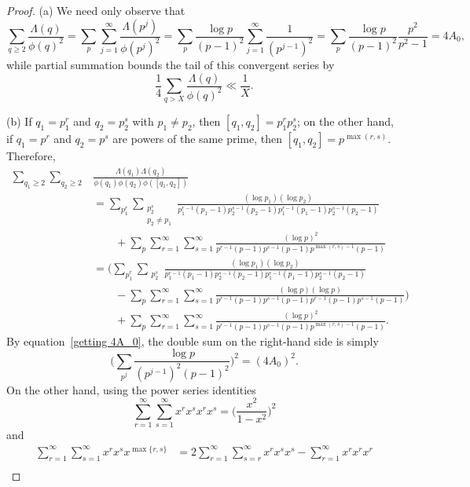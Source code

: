 \documentclass[12pt,reqno]{amsart}
\theoremstyle{definition}
\begin{document}
\begin{proof}
(a) We need only observe that
\begin{equation}  \label{getting 4A_0}
\sum_{q \geq 2} \frac{\Lambda(q)}{\phi(q)^2} = \sum_{p} \sum_{j = 1}^\infty \frac{\Lambda(p^j)}{\phi(p^j)^2} = \sum_{p} \frac{\log p}{(p-1)^2} \sum_{j = 1}^\infty \frac{1}{(p^{j-1})^2} = \sum_{p} \frac{\log p}{(p-1)^2} \frac{p^2}{p^2-1} = 4A_0,
\end{equation}
while partial summation bounds the tail of this convergent series by
\[
\frac{1}{4} \sum_{q > X} \frac{\Lambda(q)}{\phi(q)^2} \ll \frac{1}{X}.
\]

(b) If $q_1 = p_1^r$ and $q_2 = p_2^s$ with $p_1 \neq p_2$, then $[q_1, q_2] = p_1^r p_2^s$; on the other hand, if $q_1 = p^r$ and $q_2 = p^s$ are powers of the same prime, then $[q_1, q_2] = p^{\max(r, s)}$. Therefore,
\begin{align}\label{varianceconstantlastpart}
\sum_{q_1\ge2}\sum_{q_2\ge2} & \frac{\Lambda(q_1)\Lambda(q_2)}{\phi(q_1)\phi(q_2)\phi([q_1, q_2])}\nonumber \\
&= \sum_{p_1^r} \sum_{\substack{p_2^s \\ p_2\ne p_1}} \frac{(\log p_1)(\log p_2)}{p_1^{r-1}(p_1-1)p_2^{s-1}(p_2-1)p_1^{r-1}(p_1-1)p_2^{s-1}(p_2-1)}  \nonumber \\
&\qquad{}+ \sum_p \sum_{r=1}^\infty \sum_{s=1}^\infty \frac{(\log p)^2}{p^{r-1}(p-1)p^{s-1}(p-1)p^{\max(r, s)-1}(p-1)} \nonumber \\
&= \bigg( \sum_{p_1^r} \sum_{\substack{p_2^s}}  \frac{(\log p_1)(\log p_2)}{p_1^{r-1}(p_1-1)p_2^{s-1}(p_2-1)p_1^{r-1}(p_1-1)p_2^{s-1}(p_2-1)}   \\
&\qquad{} - \sum_p \sum_{r=1}^\infty \sum_{s=1}^\infty \frac{(\log p)(\log p)}{p^{r-1}(p-1)p^{s-1}(p-1)p^{r-1}(p-1)p^{s-1}(p-1)} \bigg) \nonumber \\
&\qquad{}+ \sum_p \sum_{r=1}^\infty \sum_{s=1}^\infty \frac{(\log p)^2}{p^{r-1}(p-1)p^{s-1}(p-1)p^{\max(r, s)-1}(p-1)}. \nonumber
\end{align}
By equation~\eqref{getting 4A_0}, the double sum on the right-hand side is simply
\[
\bigg( \sum_{p^j} \frac{\log p}{(p^{j-1})^2(p-1)^2} \bigg)^2 = (4A_0)^2.
\]
On the other hand, using the power series identities
\[
\sum_{r=1}^\infty \sum_{s=1}^\infty x^r x^s x^r x^s = \bigg( \frac{x^2}{1-x^2} \bigg)^2
\]
and
\begin{align*}
\sum_{r=1}^\infty \sum_{s=1}^\infty x^r x^s x^{\max\{r,s\}} &= 2 \sum_{r=1}^\infty \sum_{s=r}^\infty x^r x^s x^s - \sum_{r=1}^\infty x^r x^r x^r \\

\end{align*}
\end{proof}
\end{document}
